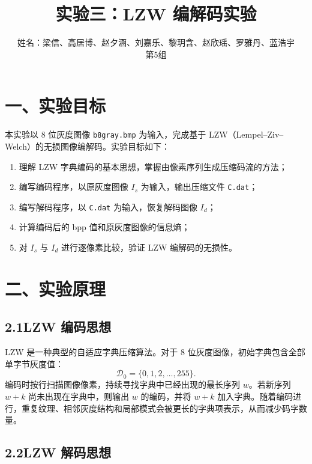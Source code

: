\documentclass[a4paper,zihao=5]{ctexart}
\title{\LARGE\textbf{实验三：LZW 编解码实验}}
\author{姓名：梁信、高居博、赵夕涵、刘嘉乐、黎玥含、赵欣瑶、罗雅丹、蓝浩宇\\[2pt]
\normalsize 第5组}
\date{}
\begin{document}
\maketitle

\section*{一、实验目标}

本实验以 8 位灰度图像 \texttt{b8gray.bmp} 为输入，完成基于 LZW（Lempel--Ziv--Welch）的无损图像编解码。实验目标如下：

\begin{enumerate}[itemsep=2pt]
  \item 理解 LZW 字典编码的基本思想，掌握由像素序列生成压缩码流的方法；
  \item 编写编码程序，以原灰度图像 $I_s$ 为输入，输出压缩文件 \texttt{C.dat}；
  \item 编写解码程序，以 \texttt{C.dat} 为输入，恢复解码图像 $I_d$；
  \item 计算编码后的 bpp 值和原灰度图像的信息熵；
  \item 对 $I_s$ 与 $I_d$ 进行逐像素比较，验证 LZW 编解码的无损性。
\end{enumerate}

\section*{二、实验原理}

\subsection*{2.1\quad LZW 编码思想}

LZW 是一种典型的自适应字典压缩算法。对于 8 位灰度图像，初始字典包含全部单字节灰度值：
\begin{equation}
  \mathcal{D}_0 = \{0,1,2,\ldots,255\}.
\end{equation}
编码时按行扫描图像像素，持续寻找字典中已经出现的最长序列 $w$。若新序列 $w+k$ 尚未出现在字典中，则输出 $w$ 的编码，并将 $w+k$ 加入字典。随着编码进行，重复纹理、相邻灰度结构和局部模式会被更长的字典项表示，从而减少码字数量。

\subsection*{2.2\quad LZW 解码思想}
\end{document}
